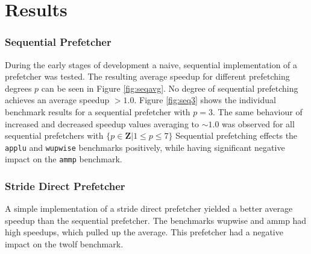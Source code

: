 \section{Results}
\label{sec:results}
%
\subsubsection{Sequential Prefetcher}
During the early stages of development a naive, sequential implementation of a prefetcher was tested.
The resulting average speedup for different prefetching degrees $p$ can be seen in Figure \ref{fig:seqavg}.
No degree of sequential prefetching achieves an average speedup $> 1.0$.
Figure \ref{fig:seq3} shows the individual benchmark results for a sequential prefetcher with $p = 3$.
The same behaviour of increased and decreased speedup values averaging to $\sim 1.0$ was observed for all sequential prefetchers with $\{p \in \mathbf{Z} | 1 \leq p \leq 7\}$
Sequential prefetching effects the \texttt{applu} and \texttt{wupwise} benchmarks positively, while having significant negative impact on the \texttt{ammp} benchmark.

\begin{figure*}
    
    \caption{Average speedup as a function of degree for the sequential prefetcher.}
    \label{fig:seqavg}
\end{figure*}

\begin{figure*}
\label{fig:seq3}

\caption{Performance of sequential prefetcher with $p = 3$ across benchmarks.}
\end{figure*}

\subsubsection{Stride Direct Prefetcher}
A simple implementation of a stride direct prefetcher yielded a better average speedup than the sequential prefetcher.
The benchmarks wupwise and ammp had high speedups, which pulled up the average.
This prefetcher had a negative impact on the twolf benchmark.

